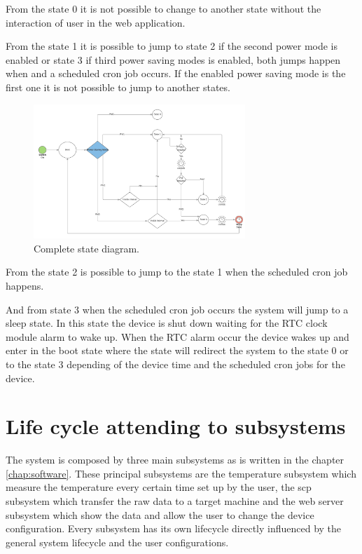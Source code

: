 		From the state 0 it is not possible to change to another state without the interaction of user in the web application.

		From the state 1 it is possible to jump to state 2 if the second power mode is enabled or state 3 if third power saving modes is enabled, both jumps happen when and a scheduled cron job occurs. If the enabled power saving mode is the first one it is not possible to jump to another states.

		\begin{figure}[h!]
		\includegraphics[width=8cm]{fig/states-pm-complete.png}
		\centering
		\caption{Complete state diagram.\label{states}}
		\end{figure}

		From the state 2 is possible to jump to the state 1 when the scheduled cron job happens.

		And from state 3 when the scheduled cron job occurs the system will jump to a sleep state. In this state the device is shut down waiting for the RTC clock module alarm to wake up. When the RTC alarm occur the device wakes up and enter in the boot state where the state will redirect the system to the state 0 or to the state 3 depending of the device time and the scheduled cron jobs for the device.

	\section{Life cycle attending to subsystems}
	The system is composed by three main subsystems as is written in the chapter \ref{chap:software}. These principal subsystems are the temperature subsystem which measure the temperature every certain time set up by the user, the scp subsystem which transfer the raw data to a target machine and the web server subsystem which show the data and allow the user to change the device configuration. Every subsystem has its own lifecycle directly influenced by the general system lifecycle and the user configurations.


